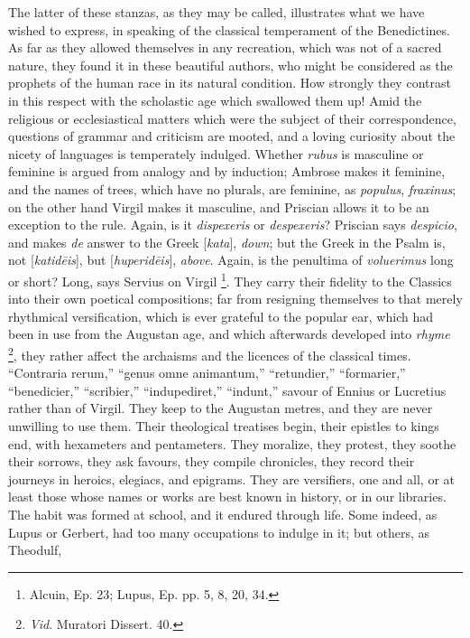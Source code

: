 The latter of these stanzas, as they may be called, illustrates
what we have wished to express, in speaking of the classical
temperament of the Benedictines. As far as they allowed themselves in
any recreation, which was not of a sacred nature, they found it in
these beautiful authors, who might be considered as the prophets of
the human race in its natural condition. How strongly they
contrast in this respect with the scholastic age which swallowed them
up! Amid the religious or ecclesiastical matters which were the
subject of their correspondence, questions of grammar and criticism
are mooted, and a loving curiosity about the nicety of languages is
temperately indulged. Whether \emph{rubus} is masculine or feminine is
argued from analogy and by induction; Ambrose makes it feminine, and
the names of trees, which have no plurals, are feminine, as \emph{populus},
\emph{fraxinus}; on the other hand Virgil makes it masculine, and
Priscian allows it to be an exception to the rule. Again, is it \emph{dispexeris}
or \emph{despexeris}? Priscian says \emph{despicio}, and makes \emph{de}
answer to the Greek [\emph{kata}], \emph{down}; but the Greek in the
Psalm is, not [\emph{katid\={e}is}], but [\emph{huperid\={e}is}],
\emph{above}. Again, is the penultima of \emph{voluerimus} long or
short? Long, says Servius on Virgil \footnote{Alcuin, Ep.
23; Lupus, Ep. pp. 5, 8, 20, 34.}. They carry their fidelity to the Classics into their own
poetical compositions; far from resigning themselves to that merely
rhythmical versification, which is ever grateful to the popular ear,
which had been in use from the Augustan age, and which afterwards
developed into \emph{rhyme} \footnote{\emph{Vid}.
Muratori Dissert. 40.},
they rather affect the archaisms and the licences of the classical
times. ``Contraria rerum,'' ``genus omne animantum,''
``retundier,'' ``formarier,'' ``benedicier,''
``scribier,'' ``indupediret,'' ``indunt,''
savour of Ennius or Lucretius rather than of Virgil. They keep to the
Augustan metres, and they are never unwilling to use them. Their
theological treatises begin, their epistles to kings end, with
hexameters and pentameters. They moralize, they protest, they soothe
their sorrows, they ask favours, they compile chronicles, they record
their journeys in heroics, elegiacs, and epigrams. They are versifiers, one and all, or at least those whose names or works are
best known in history, or in our libraries. The habit was formed at
school, and it endured through life. Some indeed, as Lupus or Gerbert,
had too many occupations to indulge in it; but others, as Theodulf,
